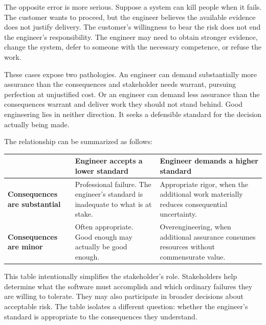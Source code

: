 The opposite error is more serious. Suppose a system can kill people when it fails. The customer
wants to proceed, but the engineer believes the available evidence does not justify delivery. The
customer's willingness to bear the risk does not end the engineer's responsibility. The engineer
may need to obtain stronger evidence, change the system, defer to someone with the necessary
competence, or refuse the work.

These cases expose two pathologies. An engineer can demand substantially more assurance than the
consequences and stakeholder needs warrant, pursuing perfection at unjustified cost. Or an engineer
can demand less assurance than the consequences warrant and deliver work they should not stand
behind. Good engineering lies in neither direction. It seeks a defensible standard for the decision
actually being made.

The relationship can be summarized as follows:

{\def\LTcaptype{none} %
\begin{longtable}[]{@{}
  >{\raggedright\arraybackslash}p{}
  >{\raggedright\arraybackslash}p{}
  >{\raggedright\arraybackslash}p{}@{}}
\toprule\noalign{}
\begin{minipage}[b]{\linewidth}\raggedright
\end{minipage} & \begin{minipage}[b]{\linewidth}\raggedright
Engineer accepts a lower standard
\end{minipage} & \begin{minipage}[b]{\linewidth}\raggedright
Engineer demands a higher standard
\end{minipage} \\
\midrule\noalign{}
\endhead
\bottomrule\noalign{}
\endlastfoot
\textbf{Consequences are substantial} & Professional failure. The engineer's standard is inadequate to what is at stake. & Appropriate rigor, when the additional work materially reduces consequential uncertainty. \\
\textbf{Consequences are minor} & Often appropriate. Good enough may actually be good enough. & Overengineering, when additional assurance consumes resources without commensurate value. \\
\end{longtable}
}

This table intentionally simplifies the stakeholder's role. Stakeholders help determine what the
software must accomplish and which ordinary failures they are willing to tolerate. They may also
participate in broader decisions about acceptable risk. The table isolates a different question:
whether the engineer's standard is appropriate to the consequences they understand.

